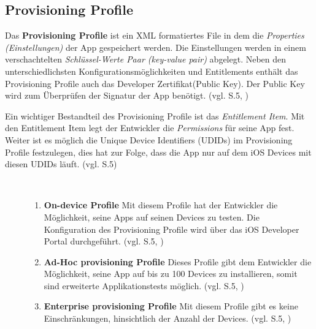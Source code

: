 \subsection{Provisioning Profile}
\label{sec:ProvisioningProfile}
Das \textbf{Provisioning Profile} ist ein XML formatiertes File in dem die \textit{\glqq Properties (Einstellungen)\grqq{}} der App gespeichert werden. Die Einstellungen werden in einem verschachtelten \textit{\glqq Schlüssel-Werte Paar (key-value pair)\grqq{}} abgelegt. Neben den unterschiedlichsten Konfigurationsmöglichkeiten und Entitlements enthält das Provisioning Profile auch das Developer Zertifikat(Public Key). Der Public Key wird zum Überprüfen der Signatur der App benötigt. (vgl. \cite{iOSSec[5]} S.5, \cite{Hacking[1], ProvisioningProfile[1], ProvisioningProfile[2]}) \par
Ein wichtiger Bestandteil des Provisioning Profile ist das \textit{\glqq Entitlement Item\grqq{}}. Mit den Entitlement Item legt der Entwickler die \textit{\glqq Permissions\grqq{}} für seine App fest. Weiter ist es möglich die Unique Device Identifiers (UDIDs) im Provisioning Profile festzulegen, dies hat zur Folge, dass die App nur auf dem iOS Devices mit diesen UDIDs läuft. (vgl. \cite{iOSSec[5]} S.5) \par 

\begin{description}
    \item[\parbox{\textwidth} {Es gibt drei unterschiedliche Arten von Provisioning Profiles }]~\par
    \begin{enumerate}
        \item \textbf{On-device Profile} \newline
Mit diesem Profile hat der Entwickler die Möglichkeit, seine Apps auf seinen Devices zu testen. Die Konfiguration des Provisioning Profile wird über das iOS Developer Portal durchgeführt. (vgl. \cite{iOSSec[5]} S.5, \cite{AppDist[1]})
    
        \item \textbf{Ad-Hoc provisioning Profile} \newline
Dieses Profile gibt dem Entwickler die Möglichkeit, seine App auf bis zu 100 Devices zu installieren, somit sind erweiterte Applikationstests möglich. (vgl. \cite{iOSSec[5]} S.5, \cite{AppDist[1]})
    
        \item \textbf{Enterprise provisioning Profile} \newline
Mit diesem Profile gibt es keine Einschränkungen, hinsichtlich der Anzahl der Devices. (vgl. \cite{iOSSec[5]} S.5, \cite{AppDist[1]})
    \end{enumerate}
\end{description} 


